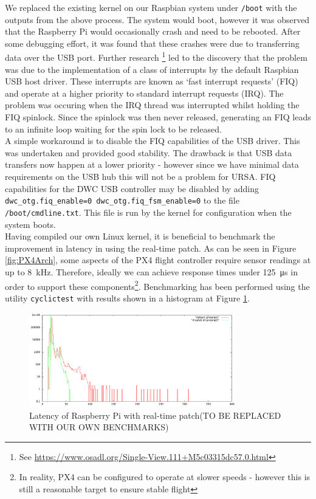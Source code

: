 \documentclass[capstone_report.tex]{subfiles}
\begin{document}
    We replaced the existing kernel on our Raspbian system under \texttt{/boot} with the outputs from the above process. The system would boot, however it was observed that the Raspberry Pi would occasionally crash and need to be rebooted. After some debugging effort, it was found that these crashes were due to transferring data over the USB port. Further research \footnote{See \url{https://www.osadl.org/Single-View.111+M5c03315dc57.0.html}} led to the discovery that the problem was due to the implementation of a class of interrupts by the default Raspbian USB host driver. These interrupts are known as `fast interrupt requests' (FIQ) and operate at a higher priority to standard interrupt requests (IRQ). The problem was occuring when the IRQ thread was interrupted whilst holding the FIQ spinlock. Since the spinlock was then never released, generating an FIQ leads to an infinite loop waiting for the spin lock to be released. \\

    A simple workaround is to disable the FIQ capabilities of the USB driver. This was undertaken and provided good stability. The drawback is that USB data transfers now happen at a lower priority - however since we have minimal data requirements on the USB hub this will not be a problem for URSA. FIQ capabilities for the DWC USB controller may be disabled by adding \texttt{dwc\_otg.fiq\_enable=0 dwc\_otg.fiq\_fsm\_enable=0} to the file \texttt{/boot/cmdline.txt}. This file is run by the kernel for configuration when the system boots.\\

    Having compiled our own Linux kernel, it is beneficial to benchmark the improvement in latency in using the real-time patch. As can be seen in Figure \ref{fig:PX4Arch}, some aspects of the PX4 flight controller require sensor readings at up to \SI{8}{\kilo\hertz}. Therefore, ideally we can achieve response times under \SI{125}{\micro\second} in order to support these components\footnote{In reality, PX4 can be configured to operate at slower speeds - however this is still a reasonable target to ensure stable flight}. Benchmarking has been performed using the utility \texttt{cyclictest} with results shown in a histogram at Figure \ref{fig:RT_bench}.

    \begin{figure}[H]
        \centering
        \includegraphics[width=0.8\textwidth]{imgs/rpi2-cyclictest-plot.png}
        \caption{Latency of Raspberry Pi with real-time patch(TO BE REPLACED WITH OUR OWN BENCHMARKS)\label{fig:RT_bench}}
    \end{figure}
\end{document}
